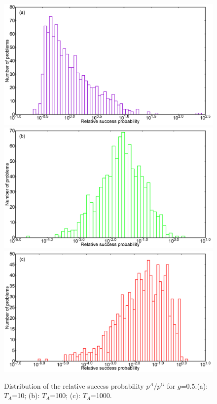 \documentclass[../main.tex]{subfiles}
\begin{document}
\begin{figure}
\centering 
\includegraphics[scale=0.24]{A_T10_g0.png}
\includegraphics[scale=0.24]{A_T100_g0.png}
\includegraphics[scale=0.24]{A_T1000_g0.png}
\caption{Distribution of the relative success probability $p^A/p^O$ for $g$=0.5.(a): $T_A$=10; (b): $T_A$=100; (c): $T_A$=1000.}
\label{fig:a10}
\end{figure}
\end{document}
